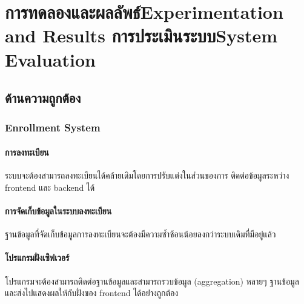 \chapter{\ifproject%
\ifcpe การทดลองและผลลัพธ์\else Experimentation and Results\fi
\else%
\ifcpe การประเมินระบบ\else System Evaluation\fi
\fi}

\section{ด้านความถูกต้อง}

\subsection{Enrollment System}

\subsubsection{การลงทะเบียน}

ระบบจะต้องสามารถลงทะเบียนได้คล้ายเดิมโดยการปรับแต่งในส่วนของการ ติดต่อข้อมูลระหว่าง frontend และ backend ได้

\subsubsection{การจัดเก็บข้อมูลในระบบลงทะเบียน}

ฐานข้อมูลที่จัดเก็บข้อมูลการลงทะเบียนจะต้องมีความซ้ำซ้อนน้อยลงกว่าระบบเดิมที่มีอยู่แล้ว

\subsubsection{โปรแกรมฝั่งเซิฟเวอร์}

โปรแกรมจะต้องสามารถติดต่อฐานข้อมูลและสามารถรวบข้อมูล (aggregation) หลายๆ ฐานข้อมูลและส่งไปแสดงผลให้กับฝั่งของ frontend ได้อย่่างถูกต้อง
